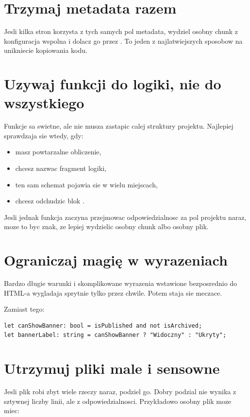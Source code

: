 \section{Trzymaj metadata razem}
Jesli kilka stron korzysta z tych samych pol metadata, wydziel osobny chunk z konfiguracja
wspolna i dolacz go przez . To jeden z najlatwiejszych sposobow na unikniecie
kopiowania kodu.

\section{Uzywaj funkcji do logiki, nie do wszystkiego}
Funkcje sa swietne, ale nie musza zastapic calej struktury projektu. Najlepiej sprawdzaja
sie wtedy, gdy:

\begin{itemize}
  \item masz powtarzalne obliczenie,
  \item chcesz nazwac fragment logiki,
  \item ten sam schemat pojawia sie w wielu miejscach,
  \item chcesz odchudzic blok .
\end{itemize}

Jesli jednak funkcja zaczyna przejmowac odpowiedzialnosc za pol projektu naraz, moze to
byc znak, ze lepiej wydzielic osobny chunk albo osobny plik.

\section{Ograniczaj magię w wyrazeniach}
Bardzo długie warunki i skomplikowane wyrazenia wstawione bezposrednio do HTML-a wygladaja
sprytnie tylko przez chwile. Potem staja sie meczace.

Zamiast tego:

\begin{lstlisting}[style=moonchunk,caption={Lepsza czytelnosc przez nazwy pomocnicze}]
let canShowBanner: bool = isPublished and not isArchived;
let bannerLabel: string = canShowBanner ? "Widoczny" : "Ukryty";
\end{lstlisting}

\section{Utrzymuj pliki male i sensowne}
Jesli plik robi zbyt wiele rzeczy naraz, podziel go. Dobry podzial nie wynika z sztywnej
liczby linii, ale z odpowiedzialnosci. Przykładowo osobny plik moze miec:

